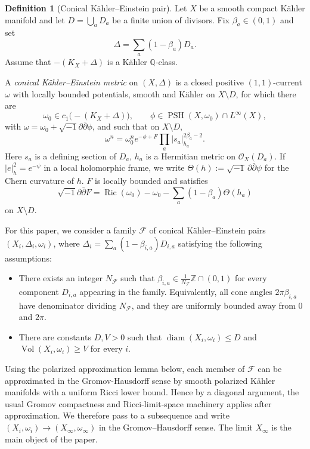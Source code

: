 \documentclass[11pt]{amsart}
\theoremstyle{definition}
\newtheorem{definition}[theorem]{Definition}
\theoremstyle{remark}
\begin{document}
\begin{definition}[Conical K\"ahler--Einstein pair]
Let $X$ be a smooth compact K\"ahler manifold and let
$D=\bigcup_a D_a$ be a finite union of divisors. Fix
$\beta_a\in(0,1)$ and set
\[
        \Delta=\sum_a(1-\beta_a)D_a.
\]
Assume that $-(K_X+\Delta)$ is a K\"ahler $\mathbb Q$-class.

A \emph{conical K\"ahler--Einstein metric} on $(X,\Delta)$ is a closed
positive $(1,1)$-current $\omega$ with locally bounded potentials, smooth and
K\"ahler on $X\setminus D$, for which there are
\[
        \omega_0\in c_1\bigl(-(K_X+\Delta)\bigr),
        \qquad
        \phi\in\operatorname{PSH}(X,\omega_0)\cap L^\infty(X),
\]
with $\omega=\omega_0+\sqrt{-1}\partial\bar\partial\phi$, and such that on
$X\setminus D$,
\[
        \omega^n
        =
        \omega_0^n e^{-\phi+F}
        \prod_a |s_a|_{h_a}^{2\beta_a-2}.
\]
Here $s_a$ is a defining section of $D_a$, $h_a$ is a Hermitian metric on
$\mathcal O_X(D_a)$. If $|e|_h^2=e^{-\psi}$ in a local holomorphic frame, we write
$\Theta(h):=\sqrt{-1}\,\partial\bar\partial\psi$ for the Chern curvature of $h$.
$F$ is locally bounded and satisfies
\[
        \sqrt{-1}\partial\bar\partial F
        =
        \operatorname{Ric}(\omega_0)-\omega_0
        -\sum_a(1-\beta_a)\Theta(h_a)
\]
on $X\setminus D$.
\end{definition}


For this paper, we consider a family $\mathcal F$ of conical K\"ahler--Einstein
pairs $(X_i,\Delta_i,\omega_i)$, where $\Delta_i=\sum_a (1-\beta_{i,a})D_{i,a}$
satisfying the following assumptions:
\begin{itemize}
    \item There exists an integer $N_{\mathcal F}$ such that
    $\beta_{i,a}\in \frac{1}{N_{\mathcal F}}\mathbb Z\cap(0,1)$ for every
    component $D_{i,a}$ appearing in the family. Equivalently, all cone angles
    $2\pi\beta_{i,a}$ have denominator dividing $N_{\mathcal F}$, and they are
    uniformly bounded away from $0$ and $2\pi$.

    \item There are constants $D,V>0$ such that
    $\operatorname{diam}(X_i,\omega_i)\leq D$ and
    $\operatorname{Vol}(X_i,\omega_i)\geq V$ for every $i$.
\end{itemize}

Using the polarized approximation lemma below, each member of $\mathcal F$ can
be approximated in the Gromov-Hausdorff sense by smooth polarized K\"ahler
manifolds with a uniform Ricci lower bound. Hence by a diagonal argument, the usual Gromov compactness and Ricci-limit-space machinery applies after approximation. We therefore pass to a subsequence and
write $(X_i,\omega_i)\longrightarrow (X_\infty,\omega_\infty)$ in the Gromov--Hausdorff sense. The limit $X_\infty$ is the main object of the
paper.
\end{document}
